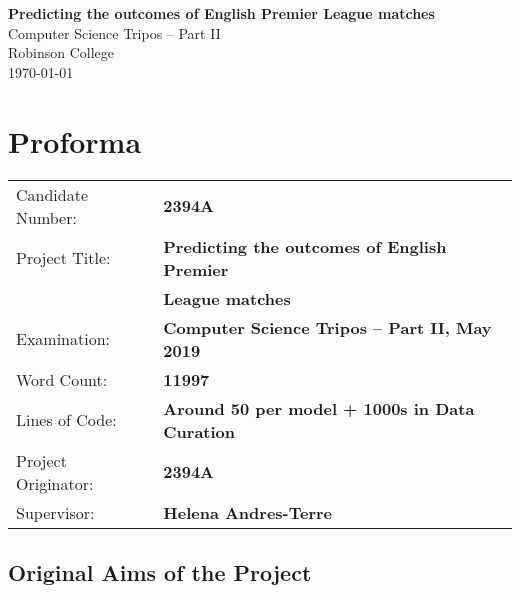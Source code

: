 \documentclass[12pt,a4paper,twoside,openright]{report}
\begin{document}





\pagestyle{empty}


\vspace*{60mm}
\begin{center}
\Huge
\textbf{Predicting the outcomes of English Premier League matches} \\[5mm]
Computer Science Tripos -- Part II \\[5mm]
Robinson College \\[5mm]
\today  %
\end{center}


\pagestyle{plain}

\chapter*{\vspace{-2.5cm}Proforma}

{\large
\begin{tabular}{ll}
Candidate Number:   & \bf 2394A                 \\
Project Title:      & \bf Predicting the outcomes of English Premier \\
                    & \bf League matches \\
Examination:        & \bf Computer Science Tripos -- Part II, May 2019  \\
Word Count:         & \bf 11997\footnotemark[1]  \\
Lines of Code:      & \bf Around 50 per model + 1000s in Data Curation \\
Project Originator: & \bf 2394A                \\
Supervisor:         & \bf Helena Andres-Terre                 \\ 
\end{tabular}
}

\vspace{-0.5cm}

\section*{Original Aims of the Project}
\end{document}
